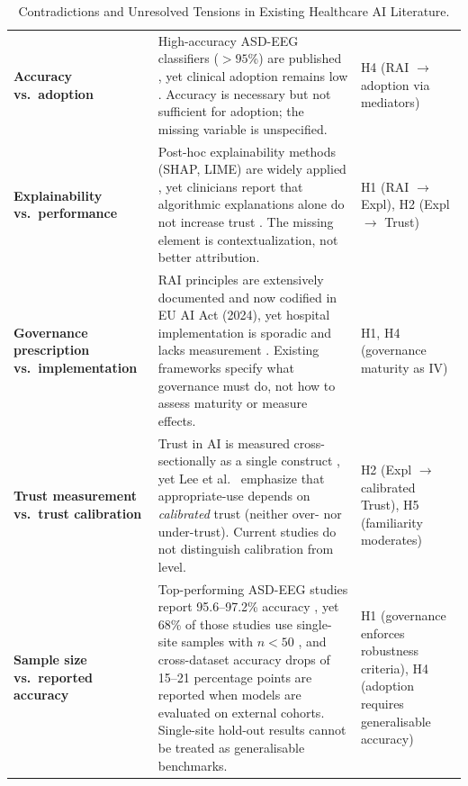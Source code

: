 {\tablestripes\tablefontsize
\begin{xltabular}{\textwidth}{@{} >{\raggedright\arraybackslash}p{2.9cm} p{7.9cm} >{\raggedright\arraybackslash}p{3.5cm} @{}}
\caption[Contradictions in Existing Healthcare AI Literature]{Contradictions and Unresolved Tensions in Existing Healthcare AI Literature.}\label{tab:lit_contradictions} \\
\toprule
{} &  &  \\
\midrule
\endfirsthead
\endhead
\bottomrule
\endlastfoot
\textbf{Accuracy vs.\ adoption} & High-accuracy ASD-EEG classifiers ($>95$\%) are published \cite{bosl2018eeg, ari2022asd}, yet clinical adoption remains low \cite{kelly2019healthcare}. Accuracy is necessary but not sufficient for adoption; the missing variable is unspecified. & H4 (RAI $\to$ adoption via mediators) \\
\textbf{Explainability vs.\ performance} & Post-hoc explainability methods (SHAP, LIME) are widely applied \cite{arrieta2020xai}, yet clinicians report that algorithmic explanations alone do not increase trust \cite{holzinger2022xai}. The missing element is contextualization, not better attribution. & H1 (RAI $\to$ Expl), H2 (Expl $\to$ Trust) \\
\textbf{Governance prescription vs.\ implementation} & RAI principles are extensively documented \cite{floridi2018ai4people} and now codified in EU AI Act (2024), yet hospital implementation is sporadic and lacks measurement \cite{kelly2019healthcare}. Existing frameworks specify what governance must do, not how to assess maturity or measure effects. & H1, H4 (governance maturity as IV) \\
\textbf{Trust measurement vs.\ trust calibration} & Trust in AI is measured cross-sectionally as a single construct \cite{madsen2000measuring}, yet Lee et al.~\cite{lee2004trust} emphasize that appropriate-use depends on \emph{calibrated} trust (neither over- nor under-trust). Current studies do not distinguish calibration from level. & H2 (Expl $\to$ calibrated Trust), H5 (familiarity moderates) \\
\textbf{Sample size vs.\ reported accuracy} & Top-performing ASD-EEG studies report 95.6--97.2\% accuracy \cite{ari2022asd, sinha2022asd, esqueda2022asd_eeg}, yet 68\% of those studies use single-site samples with $n < 50$ \cite{kelly2019healthcare}, and cross-dataset accuracy drops of 15--21 percentage points are reported when models are evaluated on external cohorts. Single-site hold-out results cannot be treated as generalisable benchmarks. & H1 (governance enforces robustness criteria), H4 (adoption requires generalisable accuracy) \\

\end{xltabular}}
